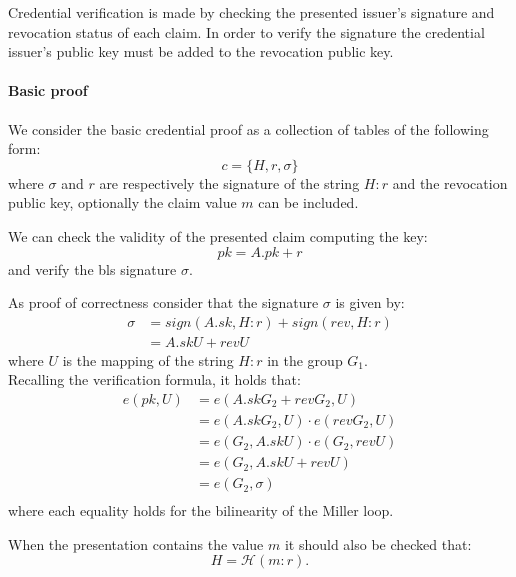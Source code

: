 Credential verification is made by checking the presented issuer's
signature and revocation status of each claim. In order to verify the
signature the credential issuer's public key must be added to the
revocation public key.

\paragraph{Basic proof}

We consider the basic credential proof as a collection of tables of
the following form:
\begin{equation*}
    c = \{H, r, \sigma \}
\end{equation*}
where $\sigma$ and $r$ are respectively the signature of the string
$H : r$ and the revocation public key, optionally the claim value $m$ can
be included.

We can check the validity of the presented claim computing the key:
\begin{equation*}
    pk = A.pk + r
\end{equation*}
and verify the bls signature $\sigma$.

As proof of correctness consider that the signature $\sigma$ is given
by:
\begin{equation*}
\begin{split}
    \sigma &= sign(A.sk, H:r) + sign(rev, H:r) \\
     &= A.sk U + rev U
\end{split}
\end{equation*}
where $U$ is the mapping of the string $H : r$ in the group $G_1$.\\
Recalling the verification formula, it holds that:
\begin{equation*}
\begin{split}
 e(pk, U) &= e(A.skG_2 + revG_2, U) \\
 &= e(A.skG_2, U) \cdot e(revG_2, U) \\
 &= e(G_2, A.sk U) \cdot e(G_2, rev U) \\
 &= e(G_2, A.sk U + rev U) \\
 &= e(G_2, \sigma) \\
\end{split}
\end{equation*}
where each equality holds for the bilinearity of the Miller loop.

When the presentation contains the value $m$ it should also be checked
that:
\begin{equation*}
    H = \mathcal{H}(m : r).
\end{equation*}


